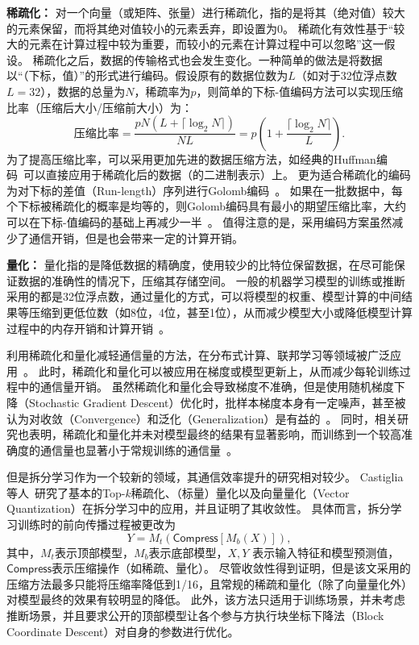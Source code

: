 \textbf{稀疏化：}
对一个向量（或矩阵、张量）进行稀疏化，指的是将其（绝对值）较大的元素保留，而将其绝对值较小的元素丢弃，即设置为0。
%
稀疏化有效性基于“较大的元素在计算过程中较为重要，而较小的元素在计算过程中可以忽略”这一假设。
%
稀疏化之后，数据的传输格式也会发生变化。一种简单的做法是将数据以“（下标，值）”的形式进行编码。假设原有的数据位数为$L$（如对于32位浮点数$L=32$），数据的总量为$N$，稀疏率为$p$，则简单的下标-值编码方法可以实现压缩比率（压缩后大小/压缩前大小）为：
\begin{equation}
    \text{压缩比率}=\dfrac{pN(L + \lceil \log_2N \rceil)}{NL} = p(1 + \dfrac{\lceil \log_2N \rceil}{L}).
\end{equation}
为了提高压缩比率，可以采用更加先进的数据压缩方法，如经典的Huffman编码~\cite{huffman1952}可以直接应用于稀疏化后的数据（的二进制表示）上。
%
更为适合稀疏化的编码为对下标的差值（Run-length）序列进行Golomb编码~\cite{gallager1975golomb}。
%
如果在一批数据中，每个下标被稀疏化的概率是均等的，则Golomb编码具有最小的期望压缩比率，大约可以在下标-值编码的基础上再减少一半~\cite{sattler2019sparse_binary}。
%
值得注意的是，采用编码方案虽然减少了通信开销，但是也会带来一定的计算开销。


\textbf{量化：}
量化指的是降低数据的精确度，使用较少的比特位保留数据，在尽可能保证数据的准确性的情况下，压缩其存储空间。
%
一般的机器学习模型的训练或推断采用的都是32位浮点数，通过量化的方式，可以将模型的权重、模型计算的中间结果等压缩到更低位数（如8位，4位，甚至1位），从而减少模型大小或降低模型计算过程中的内存开销和计算开销~\cite{zhou2016dorefa,banner2018_8bit,yang2019quantization}。




利用稀疏化和量化减轻通信量的方法，在分布式计算、联邦学习等领域被广泛应用~\cite{wen2017terngrad,sattler2019sparse_binary}。
%
此时，稀疏化和量化可以被应用在梯度或模型更新上，从而减少每轮训练过程中的通信量开销。
%
虽然稀疏化和量化会导致梯度不准确，但是使用随机梯度下降（Stochastic Gradient Descent）优化时，批样本梯度本身有一定噪声，甚至被认为对收敛（Convergence）和泛化（Generalization）是有益的~\cite{hardt2016sgd,goyal2017sgd_imagenet,chaudhari2018sgd}。
%
同时，相关研究也表明，稀疏化和量化并未对模型最终的结果有显著影响，而训练到一个较高准确度的通信量也显著小于常规训练的通信量~\cite{aji2017sparse,sattler2019sparse_binary,wen2017terngrad}。

%
但是拆分学习作为一个较新的领域，其通信效率提升的研究相对较少。
%
Castiglia等人~\cite{castiglia2022compressed_vfl}研究了基本的Top-$k$稀疏化、（标量）量化以及向量量化（Vector Quantization）在拆分学习中的应用，并且证明了其收敛性。
%
具体而言，拆分学习训练时的前向传播过程被更改为
\begin{equation}
\label{eq:split-compress}
    Y = M_t(\mathsf{Compress}[M_b(X)]),
\end{equation}
%
其中，$M_t$表示顶部模型，$M_b$表示底部模型，$X, Y$ 表示输入特征和模型预测值，$\mathsf{Compress}$表示压缩操作（如稀疏、量化）。
%
尽管收敛性得到证明，但是该文采用的压缩方法最多只能将压缩率降低到1/16，且常规的稀疏和量化（除了向量量化外）对模型最终的效果有较明显的降低。
%
此外，该方法只适用于训练场景，并未考虑推断场景，并且要求公开的顶部模型让各个参与方执行块坐标下降法（Block Coordinate Descent）对自身的参数进行优化。

